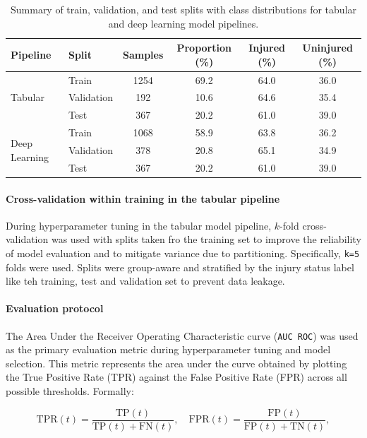 \begin{table}[htbp]
    \centering
    \caption[Train-Test-Validation Split and Class Distribution]{Summary of train, validation, and test splits with class distributions for tabular and deep learning model pipelines.}
    \label{tab:met-data-splits}
    \begin{tabular}{llcccc}
    \hline
    \textbf{Pipeline} & \textbf{Split} & \textbf{Samples} & \textbf{Proportion (\%)} & \textbf{Injured (\%)} & \textbf{Uninjured (\%)} \\
    \hline
    \multirow{3}{*}{Tabular}
      & Train & 1254 & 69.2 & 64.0 & 36.0 \\
      & Validation & 192 & 10.6 & 64.6 & 35.4 \\
      & Test & 367 & 20.2 & 61.0 & 39.0 \\
    \hline
    \multirow{3}{*}{Deep Learning}
      & Train & 1068 & 58.9 & 63.8 & 36.2 \\
      & Validation & 378 & 20.8 & 65.1 & 34.9 \\
      & Test & 367 & 20.2 & 61.0 & 39.0 \\
    \hline
    \end{tabular}
\end{table}


\paragraph{Cross-validation within training in the tabular pipeline}
During hyperparameter tuning in the tabular model pipeline, $k$-fold cross-validation was used with splits taken fro the training set to improve the reliability of model evaluation and to mitigate variance due to partitioning. Specifically, \texttt{k=5} folds were used. Splits were group-aware and stratified by the injury status label like teh training, test and validation set to prevent data leakage.

\paragraph{Evaluation protocol}
The Area Under the Receiver Operating Characteristic curve (\texttt{AUC ROC}) was used as the primary evaluation metric during hyperparameter tuning and model selection. This metric represents the area under the curve obtained by plotting the True Positive Rate (TPR) against the False Positive Rate (FPR) across all possible thresholds. Formally:  

\begin{equation}
    \mathrm{TPR}(t)=\frac{\mathrm{TP}(t)}{\mathrm{TP}(t)+\mathrm{FN}(t)},\quad
    \mathrm{FPR}(t)=\frac{\mathrm{FP}(t)}{\mathrm{FP}(t)+\mathrm{TN}(t)},
\end{equation}

